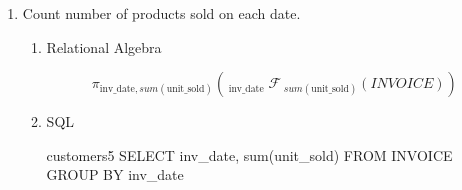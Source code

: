 \begin{enumerate}
\begin{enumerate}
		      \item Right Outer Join

		            \begin{equation*}
			            CUSTOMER \bowtie[ INVOICE
		            \end{equation*}

		            \begin{sqlQuery}{customer4b}
											SELECT CONCAT(C.cust_fname, c.cust_lname) as name,
											RIGHT JOIN INVOICE i 
											ON C.cust_num=i.cust_num
										\end{sqlQuery}

		      \item Full Outer Join

		            \begin{equation*}
			            CUSTOMER ]\bowtie[ INVOICE
		            \end{equation*}

		            \begin{sqlQuery}{customer4c}
                    SELECT CONCAT(C.cust_fname, " ", C.cust_lname) as name
                    LEFT JOIN INVOICE i
                    ON C.cust_num=i.cust_num
                    UNION
                    SELECT CONCAT(C.cust_fname, " ", C.cust_lname) as name, i.inv_amount
                    RIGHT JOIN INVOICE i
                    ON C.cust_num=i.cust_num
                    \end{sqlQuery}

	      \end{enumerate}
	      \pagebreak

	\item Count number of products sold on each date.

	      \begin{enumerate}
		      \item Relational Algebra

		            \begin{equation*}
			            \pi_{\text{inv\_date}, sum(\text{unit\_sold})}({}_{\; \text{inv\_date}} \; \mathcal{F}_{\; sum(\text{unit\_sold})} (INVOICE))
		            \end{equation*}

		      \item SQL

		            \begin{sqlQuery}{customers5}
                        SELECT inv_date, sum(unit_sold)
                        FROM INVOICE
                        GROUP BY inv_date
                    \end{sqlQuery}


\end{enumerate}
\end{enumerate}
